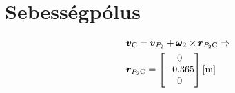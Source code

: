 \section{Sebességpólus}

\begin{align}
	&\pmb{v}_\text{C} = \pmb{v}_{P_2} + \pmb{\omega}_2 \times \pmb{r}_{{P_2}\text{C}} \Rightarrow \\
	&\pmb{r}_{{P_2}\text{C}} =
	\begin{bmatrix}
		0 \\ -0.365 \\ 0
	\end{bmatrix} \siunit{}{\m}
\end{align}
